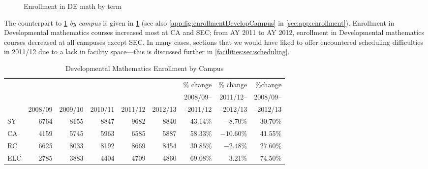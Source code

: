 \begin{figure}[!htb]
	\centering
	
	\caption{Enrollment in DE math by term}
	\label{needs:fig:enrollmentDevelopTerm}
\end{figure}

The counterpart to \cref{needs:fig:enrollmentDevelopTerm} \emph{by campus} is given in \cref{needs:tab:enrollmentDevelp} (see also \cref{app:fig:enrollmentDevelopCampus} in \vref{sec:app:enrollment}).
Enrollment in Developmental mathematics courses increased most at CA and SEC; from AY 2011 to AY 2012, enrollment in Developmental mathematics courses decreased at all campuses except SEC.
In many cases, sections that we would have liked to offer encountered scheduling difficulties in 2011/12 due to a lack in facility space---this is discussed further in  \vref{facilities:sec:scheduling}.

\begin{table}[!htb]
	\centering
	\caption{Developmental Mathematics Enrollment by Campus}
	\label{needs:tab:enrollmentDevelp}
	\begin{tabularx}{\linewidth}{X*{7}rr}
		\toprule
		    &         &         &         &         &         & \% change & \% change  & \%change  \\
		    &         &         &         &         &         & 2008/09-- & 2011/12--  & 2008/09-- \\
		    & 2008/09 & 2009/10 & 2010/11 & 2011/12 & 2012/13 & --2011/12 & --2012/13  & --2012/13 \\
		\midrule
		SY  & 6764    & 8155    & 8847    & 9682    & 8840    & 43.14\%   & $-8.70\%$  & 30.70\%   \\
		CA  & 4159    & 5745    & 5963    & 6585    & 5887    & 58.33\%   & $-10.60\%$ & 41.55\%   \\
		RC  & 6625    & 8033    & 8192    & 8669    & 8454    & $30.85\%$ & $-2.48\%$  & 27.60\%   \\
		ELC & 2785    & 3883    & 4404    & 4709    & 4860    & $69.08\%$ & 3.21\%     & 74.50\%   \\
		\bottomrule
	\end{tabularx}
\end{table}

